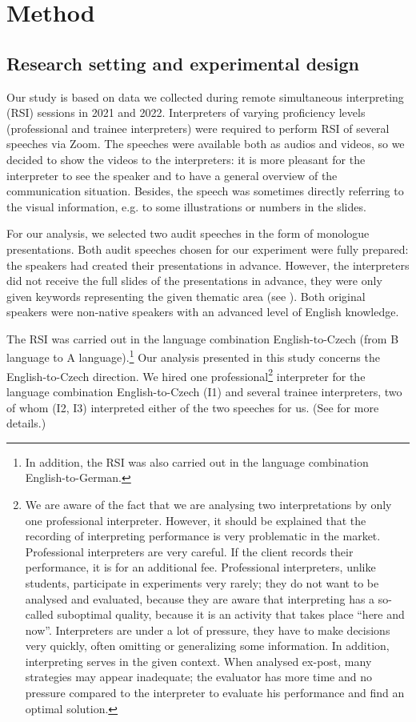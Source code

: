 \documentclass[output=paper]{langscibook}
\begin{document}
\section{Method}\label{sec:kloudova:3}

\subsection{Research setting and experimental design}

Our study is based on data we collected during remote simultaneous interpreting (RSI) sessions in 2021 and 2022. Interpreters of varying proficiency levels (professional and trainee interpreters) were required to perform RSI of several speeches via Zoom. The speeches were available both as audios and videos, so we decided to show the videos to the interpreters: it is more pleasant for the interpreter to see the speaker and to have a general overview of the communication situation. Besides, the speech was sometimes directly referring to the visual information, e.g. to some illustrations or numbers in the slides.

For our analysis, we selected two audit speeches in the form of monologue presentations. Both audit speeches chosen for our experiment were fully prepared: the speakers had created their presentations in advance. However, the interpreters did not receive the full slides of the presentations in advance, they were only given keywords representing the given thematic area (see ). Both original speakers were non-native speakers with an advanced level of English knowledge.

The RSI was carried out in the language combination English-to-Czech (from B language to A language).\footnote{{In addition, the RSI was also carried out in the language combination English-to-German.}} Our analysis presented in this study concerns the English-to-Czech direction. We hired one professional\footnote{{We are aware of the fact that we are analysing two interpretations by only one professional interpreter. However, it should be explained that the recording of interpreting performance is very problematic in the market. Professional interpreters are very careful. If the client records their performance, it is for an additional fee. Professional interpreters, unlike students, participate in experiments very rarely; they do not want to be analysed and evaluated, because they are aware that interpreting has a so-called suboptimal quality, because it is an activity that takes place “here and now”. Interpreters are under a lot of pressure, they have to make decisions very quickly, often omitting or generalizing some information. In addition, interpreting serves in the given context. When analysed ex-post, many strategies may appear inadequate; the evaluator has more time and no pressure compared to the interpreter to evaluate his performance and find an optimal solution.}} interpreter for the language combination English-to-Czech (I1) and several trainee interpreters, two of whom (I2, I3) interpreted either of the two speeches for us. (See  for more details.)
\end{document}
